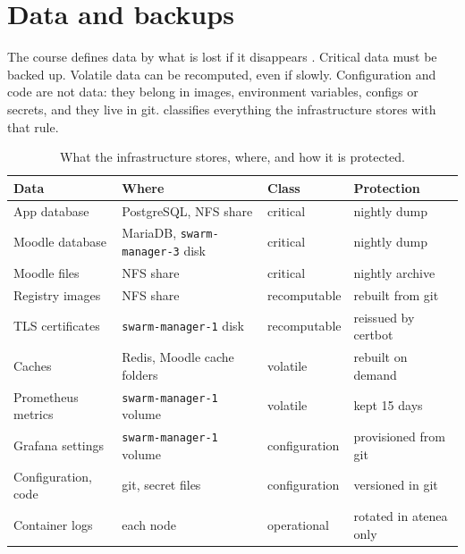 \section{Data and backups}
\label{sec:data}

The course defines data by what is lost if it disappears
\parencite{llusa2026volumes}. Critical data must be backed up. Volatile
data can be recomputed, even if slowly. Configuration and code are not
data: they belong in images, environment variables, configs or secrets,
and they live in git.  classifies everything the
infrastructure stores with that rule.

\begin{table}[htbp]
  \centering
  \caption{What the infrastructure stores, where, and how it is protected.}
  \label{tab:data}
  \small
  \begin{tabular}{llll}
    \toprule
    Data                   & Where                                 & Class         & Protection \\
    \midrule
    App database           & PostgreSQL, NFS share                 & critical      & nightly dump \\
    Moodle database        & MariaDB, \texttt{swarm-manager-3} disk & critical      & nightly dump \\
    Moodle files           & NFS share                             & critical      & nightly archive \\
    Registry images        & NFS share                             & recomputable  & rebuilt from git \\
    TLS certificates       & \texttt{swarm-manager-1} disk         & recomputable  & reissued by certbot \\
    Caches                 & Redis, Moodle cache folders           & volatile      & rebuilt on demand \\
    Prometheus metrics     & \texttt{swarm-manager-1} volume       & volatile      & kept 15 days \\
    Grafana settings       & \texttt{swarm-manager-1} volume       & configuration & provisioned from git \\
    Configuration, code    & git, secret files                     & configuration & versioned in git \\
    Container logs         & each node                             & operational   & rotated in atenea only \\
    \bottomrule
  \end{tabular}
\end{table}

